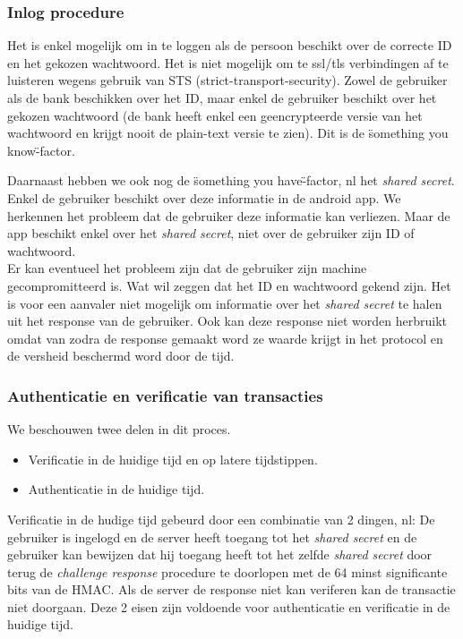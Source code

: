 \documentclass[11pt]{article}
\begin{document}
\subsubsection{Inlog procedure}
Het is enkel mogelijk om in te loggen als de persoon beschikt over de correcte ID en het gekozen wachtwoord. Het is niet mogelijk om te ssl/tls verbindingen af te luisteren wegens gebruik van STS (strict-transport-security). Zowel de gebruiker als de bank beschikken over het ID, maar enkel de gebruiker beschikt over het gekozen wachtwoord (de bank heeft enkel een geencrypteerde versie van het wachtwoord en krijgt nooit de plain-text versie te zien). Dit is de \"something you know\"-factor.

Daarnaast hebben we ook nog de \"something you have\"-factor, nl het \emph{shared secret}. Enkel de gebruiker beschikt over deze informatie in de android app. We herkennen het probleem dat de gebruiker deze informatie kan verliezen. Maar de app beschikt enkel over het \emph{shared secret}, niet over de gebruiker zijn ID of wachtwoord.\\

Er kan eventueel het probleem zijn dat de gebruiker zijn machine gecompromitteerd is. Wat wil zeggen dat het ID en wachtwoord gekend zijn. Het is voor een aanvaler niet mogelijk om informatie over het \emph{shared secret} te halen uit het response van de gebruiker. Ook kan deze response niet worden herbruikt omdat van zodra de response gemaakt word ze waarde krijgt in het protocol en de versheid beschermd word door de tijd.

\subsubsection{Authenticatie en verificatie van transacties}
We beschouwen twee delen in dit proces.
\begin{itemize}
\item Verificatie in de huidige tijd en op latere tijdstippen.
\item Authenticatie in de huidige tijd.
\end{itemize}
Verificatie in de hudige tijd gebeurd door een combinatie van 2 dingen, nl: De gebruiker is ingelogd en de server heeft toegang tot het \emph{shared secret} en de gebruiker kan bewijzen dat hij toegang heeft tot het zelfde \emph{shared secret} door terug de \emph{challenge response} procedure te doorlopen met de 64 minst significante bits van de HMAC. Als de server de response niet kan veriferen kan de transactie niet doorgaan. Deze 2 eisen zijn voldoende voor authenticatie en verificatie in de huidige tijd. \\
\end{document}
